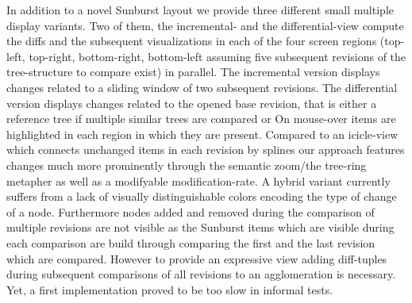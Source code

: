In addition to a novel Sunburst layout we provide three different small multiple display variants. Two of them, the incremental- and the differential-view compute the diffs and the subsequent visualizations in each of the four screen regions (top-left, top-right, bottom-right, bottom-left assuming five subsequent revisions of the tree-structure to compare exist) in parallel. The incremental version displays changes related to a sliding window of two subsequent revisions. The differential version displays changes related to the opened base revision, that is either a reference tree if multiple similar trees are compared or  On mouse-over items are highlighted in each region in which they are present. Compared to an icicle-view which connects unchanged items in each revision by splines our approach features changes much more prominently through the semantic zoom/the tree-ring metapher as well as a modifyable modification-rate. A hybrid variant currently suffers from a lack of visually distinguishable colors encoding the type of change of a node. Furthermore nodes added and removed during the comparison of multiple revisions are not visible as the Sunburst items which are visible during each comparison are build through comparing the first and the last revision which are compared. However to provide an expressive view adding diff-tuples during subsequent comparisons of all revisions to an agglomeration is necessary. Yet, a first implementation proved to be too slow in informal tests.



